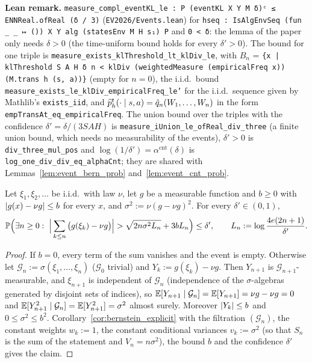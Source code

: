 \textbf{Lean remark.} \texttt{measure\_compl\_eventKL\_le : P (eventKL X Y M δ)ᶜ ≤ ENNReal.ofReal (δ / 3)}
(\texttt{EV2026/Events.lean}) for \texttt{hseq : IsAlgEnvSeq (fun \_ \_ ↦ ()) X Y alg (statesEnv M H s₁) P}
and \texttt{0 < δ}: the lemma of the paper only needs $\delta > 0$ (the time-uniform bound holds for
every $\delta' > 0$). The bound for one triple is \texttt{measure\_exists\_klThreshold\_lt\_klDiv\_le},
with $B_n$ = \texttt{\{x | klThreshold S A H δ n < klDiv (weightedMeasure (empiricalFreq x)) (M.trans h (s, a))\}}
(empty for $n = 0$), the i.i.d.\ bound \texttt{measure\_exists\_le\_klDiv\_empiricalFreq\_le'} for the
i.i.d.\ sequence given by Mathlib's \texttt{exists\_iid}, and
$\widehat{p}_h^t(\cdot \mid s, a) = \hat q_n(W_1, \dots, W_n)$ in the form
\texttt{empTransAt\_eq\_empiricalFreq}. The union bound over the triples with the confidence
$\delta' = \delta/(3SAH)$ is \texttt{measure\_iUnion\_le\_ofReal\_div\_three} (a finite union bound,
which needs no measurability of the events), $\delta' > 0$ is \texttt{div\_three\_mul\_pos} and
$\log(1/\delta') = \alpha^{\mathrm{cnt}}(\delta)$ is \texttt{log\_one\_div\_div\_eq\_alphaCnt}; they are
shared with Lemmas~\ref{lem:event_bern_prob} and~\ref{lem:event_cnt_prob}.

\begin{lemma}\label{lem:emp_bernstein_iid}
\leanok
{}
Let $\xi_1, \xi_2, \dots$ be i.i.d.\ with law $\nu$, let $g$ be a measurable function and $b \ge 0$
with $\lvert g(x) - \nu g \rvert \le b$ for every $x$, and $\sigma^2 := \nu(g - \nu g)^2$. For every
$\delta' \in (0, 1)$,
\[
  \mathbb{P}\Big(\exists n \ge 0 :\ \Big|\sum_{k \le n} \big(g(\xi_k) - \nu g\big)\Big| > \sqrt{2 n \sigma^2 L_n} + 3 b L_n\Big) \le \delta' ,
  \qquad L_n := \log\frac{4e(2n + 1)}{\delta'} .
\]
\end{lemma}

\begin{proof}
\leanok
If $b = 0$, every term of the sum vanishes and the event is empty. Otherwise let
$\mathcal G_n := \sigma(\xi_1, \dots, \xi_n)$ ($\mathcal G_0$ trivial) and $Y_k := g(\xi_k) - \nu g$.
Then $Y_{n+1}$ is $\mathcal G_{n+1}$-measurable, and $\xi_{n+1}$ is independent of $\mathcal G_n$
(independence of the $\sigma$-algebras generated by disjoint sets of indices), so
$\mathbb{E}[Y_{n+1} \mid \mathcal G_n] = \mathbb{E}[Y_{n+1}] = \nu g - \nu g = 0$ and
$\mathbb{E}[Y_{n+1}^2 \mid \mathcal G_n] = \mathbb{E}[Y_{n+1}^2] = \sigma^2$ almost surely. Moreover $\lvert Y_k \rvert \le b$
and $0 \le \sigma^2 \le b^2$. Corollary~\ref{cor:bernstein_explicit} with the filtration
$(\mathcal G_n)$, the constant weights $w_k := 1$, the constant conditional variances
$v_k := \sigma^2$ (so that $S_n$ is the sum of the statement and $V_n = n \sigma^2$), the bound $b$
and the confidence $\delta'$ gives the claim.
\end{proof}

